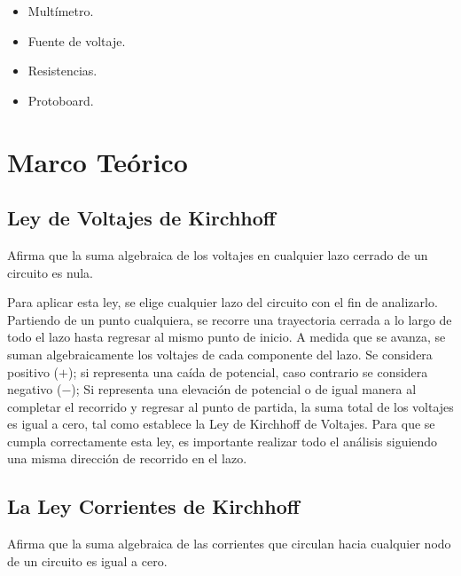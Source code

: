 \documentclass{article}
\begin{document}
    \begin{itemize}
        \item Multímetro.
        \item Fuente de voltaje.
        \item Resistencias.
        \item Protoboard.
    \end{itemize}

    \section{Marco Teórico}
    
    \subsection*{Ley de Voltajes de Kirchhoff}
    
    
    Afirma que la suma algebraica de los voltajes en cualquier lazo cerrado de un circuito es nula.
    
    Para aplicar esta ley, se elige cualquier lazo del circuito con el fin de analizarlo. Partiendo de un punto cualquiera, se recorre una trayectoria cerrada a lo largo de todo el lazo hasta regresar al mismo punto de inicio. A medida que se avanza, se suman algebraicamente los voltajes de cada componente del lazo. Se considera positivo ($+$); si representa una caída de potencial, caso contrario se considera negativo ($-$); Si representa una elevación de potencial o de igual manera al completar el recorrido y regresar al punto de partida, la suma total de los voltajes es igual a cero, tal como establece la Ley de Kirchhoff de Voltajes. Para que se cumpla correctamente esta ley, es importante realizar todo el análisis siguiendo una misma dirección de recorrido en el lazo.
    
    \subsection*{La Ley Corrientes de Kirchhoff}
    
    
    Afirma que la suma algebraica de las corrientes que circulan hacia cualquier nodo de un circuito es igual a cero.
    
\end{document}
